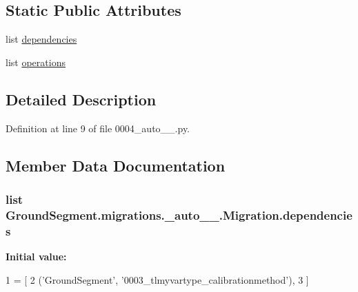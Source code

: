 \subsection*{Static Public Attributes}
\begin{DoxyCompactItemize}
\item 
list \hyperlink{class_ground_segment_1_1migrations_1_10004__auto__20161126__1516_1_1_migration_a9e661ef1a9fe9d7363dafe3b67cb14b8}{dependencies}
\item 
list \hyperlink{class_ground_segment_1_1migrations_1_10004__auto__20161126__1516_1_1_migration_abcf442a4a45a6a0280b9aa68dadde471}{operations}
\end{DoxyCompactItemize}


\subsection{Detailed Description}


Definition at line 9 of file 0004\+\_\+auto\+\_\+\_.\+py.



\subsection{Member Data Documentation}
\hypertarget{class_ground_segment_1_1migrations_1_10004__auto__20161126__1516_1_1_migration_a9e661ef1a9fe9d7363dafe3b67cb14b8}{}
\subsubsection[{dependencies}]{\setlength{\rightskip}{0pt plus 5cm}list Ground\+Segment.\+migrations.\+\_\+auto\+\_\+\_.\+Migration.\+dependencies\hspace{0.3cm}{\ttfamily [static]}}\label{class_ground_segment_1_1migrations_1_10004__auto__20161126__1516_1_1_migration_a9e661ef1a9fe9d7363dafe3b67cb14b8}
{\bfseries Initial value\+:}
\begin{DoxyCode}
1 = [
2         (\textcolor{stringliteral}{'GroundSegment'}, \textcolor{stringliteral}{'0003\_tlmyvartype\_calibrationmethod'}),
3     ]
\end{DoxyCode}


